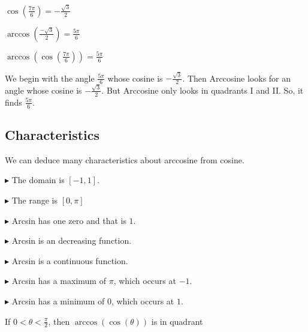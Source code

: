 \documentclass{ximera}
\begin{document}
\begin{example}



$\cos\left(\frac{7\pi}{6}\right) = -\frac{\sqrt{3}}{2}$

$\arccos\left(\frac{-\sqrt{3}}{2}\right) = \frac{5\pi}{6}$


$\arccos\left(\cos\left(\frac{7\pi}{6}\right)\right) = \frac{5\pi}{6}$




We begin with the angle $\frac{5\pi}{6}$ whose cosine is $-\frac{\sqrt{3}}{2}$.  Then Arccosine looks for an angle whose cosine is $-\frac{\sqrt{3}}{2}$.  But Arccosine only looks in quadrants I and II.  So, it finds $\frac{5\pi}{6}$.


\end{example}











\subsection{Characteristics} 

We can deduce many characteristics about arccosine from cosine.


$\blacktriangleright$ The domain is  $[-1, 1]$.


$\blacktriangleright$ The range is $[0, \pi]$


$\blacktriangleright$ Arcsin has one zero and that is $1$.


$\blacktriangleright$ Arcsin is an decreasing function.

$\blacktriangleright$ Arcsin is a continuous function.

$\blacktriangleright$ Arcsin has a maximum of $\pi$, which occurs at $-1$.

$\blacktriangleright$ Arcsin has a minimum of $0$, which occurs at $1$.








\begin{question}


If $0 < \theta < \frac{\pi}{2}$, then $\arccos(\cos(\theta))$ is in quadrant

\begin{multipleChoice}
\end{multipleChoice}

\end{question}
\end{document}
